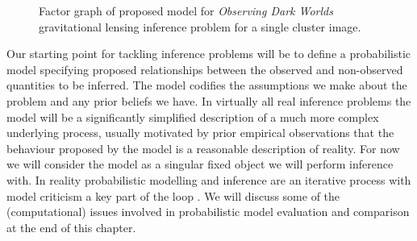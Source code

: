 \begin{figure}[!t]
\vskip 5pt
\caption[Gravitational lensing model factor graph.]{Factor graph of proposed model for \emph{Observing Dark Worlds} gravitational lensing inference problem for a single cluster image.}
\label{fig:observing-dark-worlds-factor-graph}
\end{figure}

Our starting point for tackling inference problems will be to define a probabilistic model specifying proposed relationships between the observed and non-observed quantities to be inferred. The model codifies the assumptions we make about the problem and any prior beliefs we have. In virtually all real inference problems the model will be a significantly simplified description of a much more complex underlying process, usually motivated by prior empirical observations that the behaviour proposed by the model is a reasonable description of reality. For now we will consider the model as a singular fixed object we will perform inference with. In reality probabilistic modelling and inference are an iterative process with model criticism a key part of the loop \citep{box1980sampling,gelman2013philosophy}. We will discuss some of the (computational) issues involved in probabilistic model evaluation and comparison at the end of this chapter.

